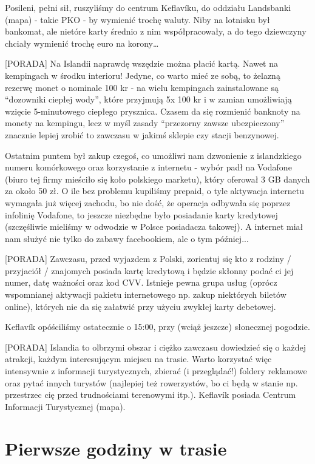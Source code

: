 \documentclass[12pt,a4paper,leqno]{book}
\newcommand{\hint}[1] {
	\vspace{6pt}
	[PORADA] #1
	\vspace{6pt}
}
\begin{document}
Posileni, pełni sił, ruszyliśmy do centrum Keflavíku, do oddziału Landsbanki (mapa) - takie PKO - by wymienić trochę waluty. Niby na lotnisku był bankomat, ale nietóre karty średnio z nim współpracowały, a do tego dziewczyny chciały wymienić trochę euro na korony…

\hint{Na Islandii naprawdę wszędzie można płacić kartą. Nawet na kempingach w środku interioru! Jedyne, co warto mieć ze sobą, to żelazną rezerwę monet o nominale 100 kr - na wielu kempingach zainstalowane są “dozowniki ciepłej wody”, które przyjmują 5x 100 kr i w zamian umożliwiają wzięcie 5-minutowego ciepłego prysznica. Czasem da się rozmienić banknoty na monety na kempingu, lecz w myśl zasady “przezorny zawsze ubezpieczony” znacznie lepiej zrobić to zawczasu w jakimś sklepie czy stacji benzynowej.}

Ostatnim puntem był zakup czegoś, co umożliwi nam dzwonienie z islandzkiego numeru komórkowego oraz korzystanie z internetu - wybór padł na Vodafone (biuro tej firmy mieściło się koło polskiego marketu), który oferował 3 GB danych za około 50 zł. O ile bez problemu kupiliśmy prepaid, o tyle aktywacja internetu wymagała już więcej zachodu, bo nie dość, że operacja odbywała się poprzez infolinię Vodafone, to jeszcze niezbędne było posiadanie karty kredytowej (szczęśliwie mieliśmy w odwodzie w Polsce posiadacza takowej). A internet miał nam służyć nie tylko do zabawy facebookiem, ale o tym później...

\hint{Zawczasu, przed wyjazdem z Polski, zorientuj się kto z rodziny / przyjaciół / znajomych posiada kartę kredytową i będzie skłonny podać ci jej numer, datę ważności oraz kod CVV. Istnieje pewna grupa usług (oprócz wspomnianej aktywacji pakietu internetowego np. zakup niektórych biletów online), których nie da się załatwić przy użyciu zwykłej karty debetowej.}

Keflavík opóściliśmy ostatecznie o 15:00, przy (wciąż jeszcze) słonecznej pogodzie.

\hint{Islandia to olbrzymi obszar i ciężko zawczasu dowiedzieć się o każdej atrakcji, każdym interesującym miejscu na trasie. Warto korzystać więc intensywnie z informacji turystycznych, zbierać (i przeglądać!) foldery reklamowe oraz pytać innych turystów (najlepiej też rowerzystów, bo ci będą w stanie np. przestrzec cię przed trudnościami terenowymi itp.). Keflavík posiada Centrum Informacji Turystycznej (mapa).}

\section{Pierwsze godziny w trasie}
\end{document}
